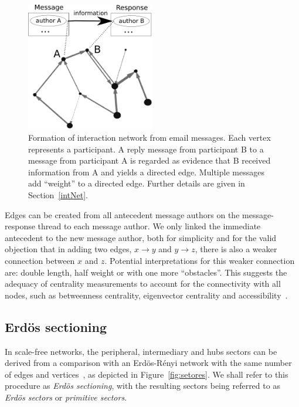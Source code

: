 \documentclass[%
	aip,
	jmp,%
	amsmath,amssymb,
	reprint,%
]{revtex4-1}
\begin{document}
\begin{figure}[!h]
	\centering
	\includegraphics[width=0.5\textwidth]{figs/criaRede__}
	\caption{Formation of interaction network from email messages. Each vertex represents a participant. A reply message from participant B to a message from participant A is regarded as evidence that B received information from A and yields a directed edge. Multiple messages add ``weight'' to a directed edge. Further details are given in Section~\ref{intNet}.}
	\label{formationNetwork}
\end{figure}

Edges can be created from all antecedent message authors on the message-response thread to each message author.
We only linked the immediate antecedent to the new message author, both for simplicity and for the valid objection that in adding two edges, $x\rightarrow y$ and $y\rightarrow z$, there is also a weaker connection between $x$ and $z$. Potential interpretations for this weaker connection are: double length, half weight or with one more ``obstacles''. This suggests the adequacy of centrality measurements to account for the connectivity with all nodes, such as betweenness centrality, eigenvector centrality and accessibility~\cite{luMeasures,access}.

\subsection{Erd\"os sectioning}\label{sectioning}
In scale-free networks, the peripheral, intermediary and hubs sectors can be derived from a comparison with an Erd\"os-R\'enyi network with the same number of edges and vertices~\cite{3setores}, as depicted in Figure~\ref{fig:setores}. We shall refer to this procedure as \emph{Erd\"os sectioning}, with the resulting sectors being referred to as \emph{Erd\"os sectors} or \emph{primitive sectors}.
\end{document}
